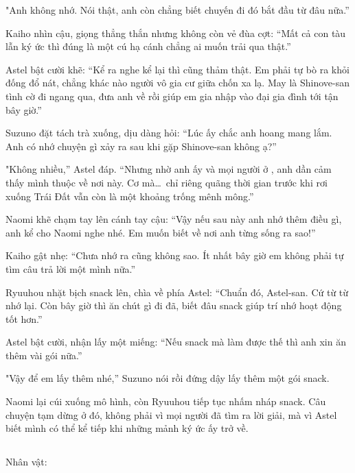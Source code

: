 \documentclass[../main.tex]{subfiles}
\begin{document}
"Anh không nhớ. Nói thật, anh còn chẳng biết chuyến đi đó bắt đầu từ đâu nữa.''

Kaiho nhìn cậu, giọng thẳng thắn nhưng không còn vẻ đùa cợt: ``Mất cả con tàu lẫn ký ức thì đúng là một cú hạ cánh chẳng ai muốn trải qua thật.''

Astel bật cười khẽ: ``Kể ra nghe kể lại thì cũng thảm thật. Em phải tự bò ra khỏi đống đổ nát, chẳng khác nào người vô gia cư giữa chốn xa lạ. May là Shinove-san tình cờ đi ngang qua, đưa anh về rồi giúp em gia nhập vào đại gia đình \hls tới tận bây giờ.''

Suzuno đặt tách trà xuống, dịu dàng hỏi: ``Lúc ấy chắc anh hoang mang lắm. Anh có nhớ chuyện gì xảy ra sau khi gặp Shinove-san không ạ?''

"Không nhiều,'' Astel đáp. ``Nhưng nhờ anh ấy và mọi người ở \hls, anh dần cảm thấy mình thuộc về nơi này. Cơ mà\dots\ chỉ riêng quãng thời gian trước khi rơi xuống Trái Đất vẫn còn là một khoảng trống mênh mông.''

Naomi khẽ chạm tay lên cánh tay cậu: ``Vậy nếu sau này anh nhớ thêm điều gì, anh kể cho Naomi nghe nhé. Em muốn biết về nơi anh từng sống ra sao!''

Kaiho gật nhẹ: ``Chưa nhớ ra cũng không sao. Ít nhất bây giờ em không phải tự tìm câu trả lời một mình nữa.''

Ryuuhou nhặt bịch snack lên, chìa về phía Astel: ``Chuẩn đó, Astel-san. Cứ từ từ nhớ lại. Còn bây giờ thì ăn chút gì đi đã, biết đâu snack giúp trí nhớ hoạt động tốt hơn.''

Astel bật cười, nhận lấy một miếng: ``Nếu snack mà làm được thế thì anh xin ăn thêm vài gói nữa.''

"Vậy để em lấy thêm nhé,'' Suzuno nói rồi đứng dậy lấy thêm một gói snack.

Naomi lại cúi xuống mô hình, còn Ryuuhou tiếp tục nhấm nháp snack. Câu chuyện tạm dừng ở đó, không phải vì mọi người đã tìm ra lời giải, mà vì Astel biết mình có thể kể tiếp khi những mảnh ký ức ấy trở về.

\newpage

\subsection*{\label{ep-M34.VII}}
\vspace{-4pt}
\begin{center}
    {\caviar\fontsize{12pt}{12pt}\selectfont Nhân vật:           }
\end{center}
\end{document}
